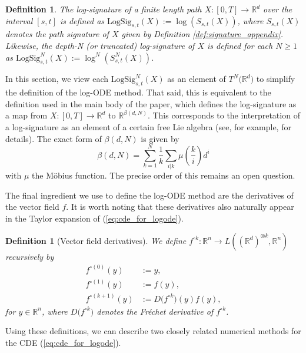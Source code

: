 \documentclass{article}
\newcommand{\R}{\mathbb{R}}
\newtheorem{definition}[theorem]{Definition}
\newcommand{\logsig}{\mathrm{LogSig}}
\newcommand{\reals}{\mathbb{R}}
\begin{document}
\begin{definition}\label{def:logsig_appendix}The \emph{log-signature} of a finite length path $X : [0,T]\rightarrow\R^d$ over the interval $[s,t]$ is defined as $\logsig_{s,t}(X) := \log(S_{s,t}(X))$, where $S_{s,t}(X)$ denotes the path signature of $X$ given by Definition \ref{def:signature_appendix}.
Likewise, the depth-N (or truncated) log-signature of $X$ is defined for each $N\geq 1$ as $\logsig_{s,t}^N(X) := \log^N(S_{s,t}^N(X))$.
\end{definition}

In this section, we view each $\logsig_{s,t}^N(X)$ as an element of $T^N\big(\R^d\big)$ to simplify the definition of the log-ODE method. That said, this is equivalent to the definition used in the main body of the paper, which defines the log-signature as a map from $X \colon [0, T] \to \reals^d$ to $\reals^{\beta(d, N)}$. This corresponds to the interpretation of a log-signature as an element of a certain free Lie algebra (see, for example, \citet{roughpath2007notes, reizenstein2017logsig} for details). The exact form of $\beta(d, N)$ is given by
\begin{equation*}
    \beta(d, N) = \sum_{k = 1}^N \frac{1}{k} \sum_{i | k} \mu\left(\frac{k}{i}\right) d^i
    \label{eq:logsig-dim}
\end{equation*}
with $\mu$ the M{\"o}bius function. The precise order of this remains an open question.

The final ingredient we use to define the log-ODE method are the derivatives of the vector field $f$.
It is worth noting that these derivatives also naturally appear in the Taylor expansion of (\ref{eq:cde_for_logode}).

\begin{definition}[Vector field derivatives]\label{def:vect_derivative} We define $f^{\circ k} : \R^n\rightarrow L((\R^d)^{\otimes k}, \R^n)$ recursively by
\begin{align*}
f^{\circ (0)}(y) & := y,\\
f^{\circ (1)}(y) & := f(y),\\
f^{\circ (k + 1)}(y) & := D\big(f^{\circ k}\big)(y)f(y),
\end{align*}
for $y\in\R^n$, where $D\big(f^{\circ k}\big)$ denotes the Fr\'{e}chet derivative of $f^{\circ k}$.
\end{definition}

Using these definitions, we can describe two closely related numerical methods for the CDE (\ref{eq:cde_for_logode}).\smallbreak
\end{document}
